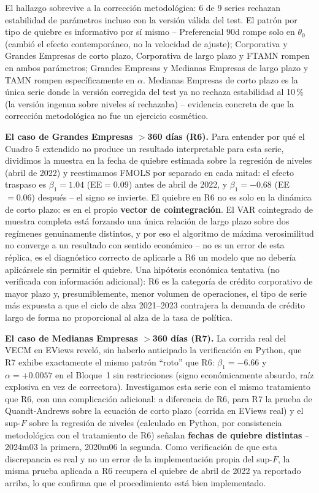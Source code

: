\documentclass[12pt, letterpaper]{article}
\begin{document}
El hallazgo sobrevive a la corrección metodológica: 6 de 9 series
rechazan estabilidad de parámetros incluso con la versión válida del
test. El patrón por tipo de quiebre es informativo por sí mismo --
Preferencial 90d rompe solo en $\theta_0$ (cambió el efecto
contemporáneo, no la velocidad de ajuste); Corporativa y Grandes
Empresas de corto plazo, Corporativa de largo plazo y FTAMN rompen en
ambos parámetros; Grandes Empresas y Medianas Empresas de largo plazo
y TAMN rompen específicamente en $\alpha$. Medianas Empresas de corto
plazo es la única serie donde la versión corregida del test ya no
rechaza estabilidad al 10\,\% (la versión ingenua sobre niveles sí
rechazaba) -- evidencia concreta de que la corrección metodológica no
fue un ejercicio cosmético.

\textbf{El caso de Grandes Empresas $>$360 días (R6).} Para entender
por qué el Cuadro 5 extendido no produce un resultado interpretable
para esta serie, dividimos la muestra en la fecha de quiebre estimada
sobre la regresión de niveles (abril de 2022) y reestimamos FMOLS por
separado en cada mitad: el efecto traspaso es $\beta_1=1.04$
(EE$=0.09$) antes de abril de 2022, y $\beta_1=-0.68$ (EE$=0.06$)
después -- el signo se invierte. El quiebre en R6 no es solo en la
dinámica de corto plazo: es en el propio \textbf{vector de
cointegración}. El VAR cointegrado de muestra completa está forzando
una única relación de largo plazo sobre dos regímenes genuinamente
distintos, y por eso el algoritmo de máxima verosimilitud no converge
a un resultado con sentido económico -- no es un error de esta
réplica, es el diagnóstico correcto de aplicarle a R6 un modelo que
no debería aplicársele sin permitir el quiebre. Una hipótesis
económica tentativa (no verificada con información adicional): R6 es
la categoría de crédito corporativo de mayor plazo y, presumiblemente,
menor volumen de operaciones, el tipo de serie más expuesta a que el
ciclo de alza 2021--2023 contrajera la demanda de crédito largo de
forma no proporcional al alza de la tasa de política.

\textbf{El caso de Medianas Empresas $>$360 días (R7).} La corrida
real del VECM en EViews reveló, sin haberlo anticipado la verificación
en Python, que R7 exhibe exactamente el mismo patrón ``roto'' que R6:
$\beta_1=-6.66$ y $\alpha=+0.0057$ en el Bloque~1 sin restricciones
(signo económicamente absurdo, raíz explosiva en vez de correctora).
Investigamos esta serie con el mismo tratamiento que R6, con una
complicación adicional: a diferencia de R6, para R7 la prueba de
Quandt-Andrews sobre la ecuación de corto plazo (corrida en EViews
real) y el sup-$F$ sobre la regresión de niveles (calculado en Python,
por consistencia metodológica con el tratamiento de R6) señalan
\textbf{fechas de quiebre distintas} -- 2024m03 la primera, 2020m06 la
segunda. Como verificación de que esta discrepancia es real y no un
error de la implementación propia del sup-$F$, la misma prueba
aplicada a R6 recupera el quiebre de abril de 2022 ya reportado
arriba, lo que confirma que el procedimiento está bien implementado.
\end{document}
